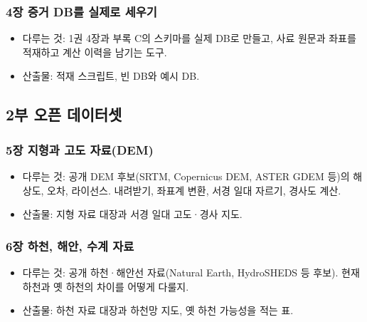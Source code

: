 \hypertarget{uxc7a5-uxc99duxac70-dbuxb97c-uxc2e4uxc81cuxb85c-uxc138uxc6b0uxae30}{%
\subsubsection{4장 증거 DB를 실제로 세우기}\label{uxc7a5-uxc99duxac70-dbuxb97c-uxc2e4uxc81cuxb85c-uxc138uxc6b0uxae30}}

\begin{itemize}
\tightlist
\item
  다루는 것: 1권 4장과 부록 C의 스키마를 실제 DB로 만들고, 사료 원문과 좌표를 적재하고 계산 이력을 남기는 도구.
\item
  산출물: 적재 스크립트, 빈 DB와 예시 DB.
\end{itemize}

\hypertarget{uxbd80-uxc624uxd508-uxb370uxc774uxd130uxc14b}{%
\subsection{2부 오픈 데이터셋}\label{uxbd80-uxc624uxd508-uxb370uxc774uxd130uxc14b}}

\hypertarget{uxc7a5-uxc9c0uxd615uxacfc-uxace0uxb3c4-uxc790uxb8ccdem}{%
\subsubsection{5장 지형과 고도 자료(DEM)}\label{uxc7a5-uxc9c0uxd615uxacfc-uxace0uxb3c4-uxc790uxb8ccdem}}

\begin{itemize}
\tightlist
\item
  다루는 것: 공개 DEM 후보(SRTM, Copernicus DEM, ASTER GDEM 등)의 해상도, 오차, 라이선스. 내려받기, 좌표계 변환, 서경 일대 자르기, 경사도 계산.
\item
  산출물: 지형 자료 대장과 서경 일대 고도·경사 지도.
\end{itemize}

\hypertarget{uxc7a5-uxd558uxcc9c-uxd574uxc548-uxc218uxacc4-uxc790uxb8cc}{%
\subsubsection{6장 하천, 해안, 수계 자료}\label{uxc7a5-uxd558uxcc9c-uxd574uxc548-uxc218uxacc4-uxc790uxb8cc}}

\begin{itemize}
\tightlist
\item
  다루는 것: 공개 하천·해안선 자료(Natural Earth, HydroSHEDS 등 후보). 현재 하천과 옛 하천의 차이를 어떻게 다룰지.
\item
  산출물: 하천 자료 대장과 하천망 지도, 옛 하천 가능성을 적는 표.
\end{itemize}

